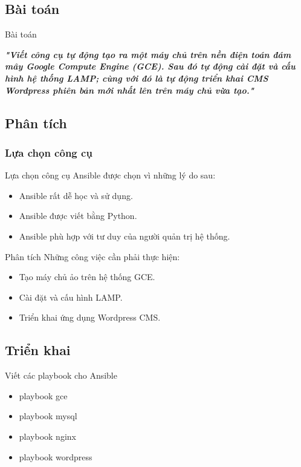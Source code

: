 \documentclass[14pt]{beamer}
\begin{document}
\subsection{Bài toán}
\begin{frame}{Bài toán}
\renewcommand{\baselinestretch}{1.50}\normalsize
  \begin{alertblock}\justifying
    \emph{\textbf{"Viết công cụ tự động tạo ra một máy chủ trên nền điện toán đám mây Google Compute Engine (GCE). Sau đó tự động cài đặt và cấu hình hệ thống LAMP; cùng với đó là tự động triển khai CMS Wordpress phiên bản mới nhất lên trên máy chủ vừa tạo."}}
  \end{alertblock}
\renewcommand{\baselinestretch}{1.0}\normalsize
\end{frame}

\subsection{Phân tích}
\subsubsection*{Lựa chọn công cụ}
\begin{frame}{Lựa chọn công cụ}
\renewcommand{\baselinestretch}{1.50}\normalsize
  Ansible được chọn vì những lý do sau:
  \begin{itemize}
    \item Ansible rất dễ học và sử dụng.
    \pause
    \item Ansible được viết bằng Python.
    \pause
    \item Ansible phù hợp với tư duy của người quản trị hệ thống.
  \end{itemize}
\renewcommand{\baselinestretch}{1.0}\normalsize
\end{frame}


\begin{frame}{Phân tích}
\renewcommand{\baselinestretch}{1.50}\normalsize
  Những công việc cần phải thực hiện:
  \begin{itemize}
    \item Tạo máy chủ ảo trên hệ thống GCE.
    \pause
    \item Cài đặt và cấu hình LAMP.
    \pause
    \item Triển khai ứng dụng Wordpress CMS.
  \end{itemize}
\renewcommand{\baselinestretch}{1.0}\normalsize
\end{frame}

\subsection{Triển khai}
\begin{frame}{Viết các playbook cho Ansible}
  \begin{itemize}
  \item playbook gce
  \item playbook mysql
  \item playbook nginx
  \item playbook wordpress
  \end{itemize}
\end{frame}
\end{document}
